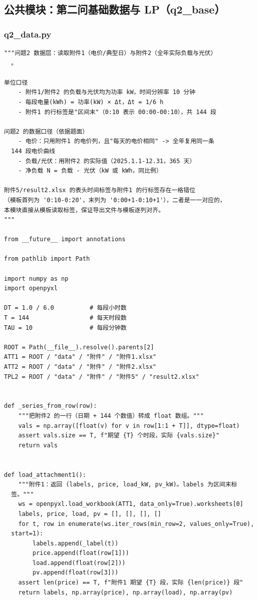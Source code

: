 \subsection{公共模块：第二问基础数据与 LP（q2\_base）}

\subsubsection*{q2\_data.py}
\begin{verbatim}
"""问题2 数据层：读取附件1（电价/典型日）与附件2（全年实际负载与光伏）
  。

单位口径
    - 附件1/附件2 的负载与光伏均为功率 kW，时间分辨率 10 分钟
    - 每段电量(kWh) = 功率(kW) × Δt，Δt = 1/6 h
    - 附件1 的行标签是"区间末"（0:10 表示 00:00-00:10），共 144 段

问题2 的数据口径（依据题面）
    - 电价：只用附件1 的电价列，且"每天的电价相同" -> 全年复用同一条
  144 段电价曲线
    - 负载/光伏：用附件2 的实际值（2025.1.1-12.31，365 天）
    - 净负载 N = 负载 - 光伏（kW 或 kWh，同比例）

附件5/result2.xlsx 的表头时间标签与附件1 的行标签存在一格错位
（模板首列为 '0:10-0:20'，末列为 '0:00+1-0:10+1'），二者是一一对应的，
本模块直接从模板读取标签，保证导出文件与模板逐列对齐。
"""

from __future__ import annotations

from pathlib import Path

import numpy as np
import openpyxl

DT = 1.0 / 6.0          # 每段小时数
T = 144                 # 每天时段数
TAU = 10                # 每段分钟数

ROOT = Path(__file__).resolve().parents[2]
ATT1 = ROOT / "data" / "附件" / "附件1.xlsx"
ATT2 = ROOT / "data" / "附件" / "附件2.xlsx"
TPL2 = ROOT / "data" / "附件" / "附件5" / "result2.xlsx"


def _series_from_row(row):
    """把附件2 的一行（日期 + 144 个数值）转成 float 数组。"""
    vals = np.array([float(v) for v in row[1:1 + T]], dtype=float)
    assert vals.size == T, f"期望 {T} 个时段，实际 {vals.size}"
    return vals


def load_attachment1():
    """附件1：返回 (labels, price, load_kW, pv_kW)。labels 为区间末标
  签。"""
    ws = openpyxl.load_workbook(ATT1, data_only=True).worksheets[0]
    labels, price, load, pv = [], [], [], []
    for t, row in enumerate(ws.iter_rows(min_row=2, values_only=True),
  start=1):
        labels.append(_label(t))
        price.append(float(row[1]))
        load.append(float(row[2]))
        pv.append(float(row[3]))
    assert len(price) == T, f"附件1 期望 {T} 段，实际 {len(price)} 段"
    return labels, np.array(price), np.array(load), np.array(pv)



\end{verbatim}
